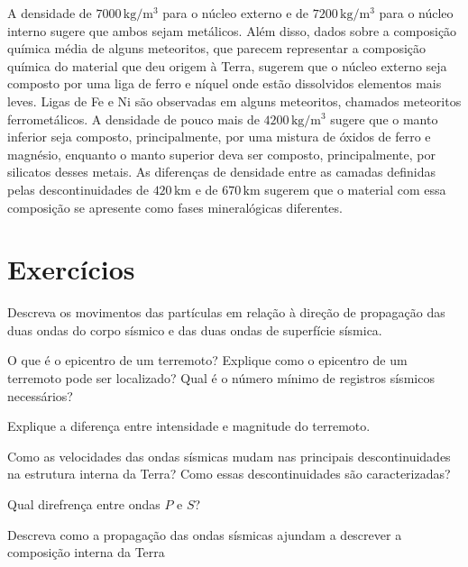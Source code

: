 \documentclass[]{book}
\theoremstyle{definition}
\theoremstyle{definition}
\theoremstyle{definition}
\theoremstyle{remark}
\let\BeginKnitrBlock\begin \let\EndKnitrBlock\end
\begin{document}
A densidade de \(7000\,\mathrm{kg/m^3}\) para o núcleo externo e de \(7200\,\mathrm{kg/m^3}\) para o núcleo interno sugere que ambos sejam metálicos. Além disso, dados sobre a composição química média de alguns meteoritos, que parecem representar a composição química do material que deu origem à Terra, sugerem que o núcleo externo seja composto por uma liga de ferro e níquel onde estão dissolvidos elementos mais leves. Ligas de Fe e Ni são observadas em alguns meteoritos, chamados meteoritos ferrometálicos. A densidade de pouco mais de \(4200\,\mathrm{kg/m^3}\) sugere que o manto inferior seja composto, principalmente, por uma mistura de óxidos de ferro e magnésio, enquanto o manto superior deva ser composto, principalmente, por silicatos desses metais. As diferenças de densidade entre as camadas definidas pelas descontinuidades de \(420\,\mathrm{km}\) e de \(670\,\mathrm{km}\) sugerem que o material com essa composição se apresente como fases mineralógicas diferentes.

\hypertarget{exercicios-1}{%
\section{Exercícios}\label{exercicios-1}}

\BeginKnitrBlock{exercise}
\protect\hypertarget{exr:exr31}{}{\label{exr:exr31} }Descreva os movimentos das partículas em relação à direção de propagação das duas ondas do corpo sísmico e das duas ondas de superfície sísmica.
\EndKnitrBlock{exercise}

\BeginKnitrBlock{exercise}
\protect\hypertarget{exr:exr32}{}{\label{exr:exr32} }O que é o epicentro de um terremoto? Explique como o epicentro de um terremoto pode ser localizado? Qual é o número mínimo de registros sísmicos necessários?
\EndKnitrBlock{exercise}

\BeginKnitrBlock{exercise}
\protect\hypertarget{exr:exr33}{}{\label{exr:exr33} }Explique a diferença entre intensidade e magnitude do terremoto.
\EndKnitrBlock{exercise}

\BeginKnitrBlock{exercise}
\protect\hypertarget{exr:exr34}{}{\label{exr:exr34} }Como as velocidades das ondas sísmicas mudam nas principais descontinuidades na estrutura interna da Terra? Como essas descontinuidades são caracterizadas?
\EndKnitrBlock{exercise}

\BeginKnitrBlock{exercise}
\protect\hypertarget{exr:exr35}{}{\label{exr:exr35} }Qual direfrença entre ondas \(P\) e \(S\)?
\EndKnitrBlock{exercise}

\BeginKnitrBlock{exercise}
\protect\hypertarget{exr:exr36}{}{\label{exr:exr36} }Descreva como a propagação das ondas sísmicas ajundam a descrever a composição interna da Terra
\EndKnitrBlock{exercise}


\end{document}

